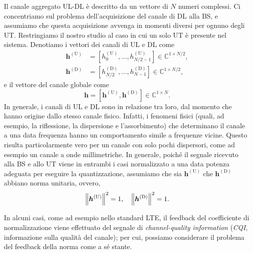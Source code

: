 Il canale aggregato UL-DL è descritto da un vettore di \(N\) numeri complessi.
Ci concentriamo sul problema dell'acquisizione del canale di DL alla BS, e
assumiamo che questa acquisizione avvenga in momenti diversi per ognuno degli
UT. Restringiamo il nostro studio al caso in cui un solo UT è presente nel
sistema. Denotiamo i vettori dei canali di UL e DL come
\begin{equation}
    \begin{aligned}
        \bm{h}^\mathrm{(U)} &= \left[
            h_0^\mathrm{(U)}, \dots, h_{N/2-1}^\mathrm{(U)}
            \right] \in \mathbb{C}^{1 \times N/2},\\
        \bm{h}^\mathrm{(D)} &= \left[
            h_{N/2}^\mathrm{(D)}, \dots, h_{N-1}^\mathrm{(D)}
            \right] \in \mathbb{C}^{1 \times N/2},
    \end{aligned}
\end{equation}
e il vettore del canale globale come
\begin{equation}
    \bm{h} = \left[
        \bm{h}^\mathrm{(U)}, \bm{h}^\mathrm{(D)}
        \right] \in \mathbb{C}^{1 \times N}.
\end{equation}
In generale, i canali di UL e DL sono in relazione tra loro, dal momento che
hanno origine dallo stesso canale fisico. Infatti, i fenomeni fisici (quali, ad
esempio, la riflessione, la dispersione e l'assorbimento) che determinano il
canale a una data frequenza hanno un comportamento simile a frequenze vicine.
Questo risulta particolarmente vero per un canale con solo pochi dispersori,
come ad esempio un canale a onde millimetriche. In generale, poiché il segnale
ricevuto alla BS e allo UT viene in entrambi i casi normalizzato a una data
potenza adeguata per eseguire la quantizzazione, assumiamo che sia
\(\bm{h}^\mathrm{(U)}\) che \(\bm{h}^\mathrm{(D)}\) abbiano norma unitaria,
ovvero,
\begin{equation}
    \left\| \bm{h}^\mathrm{(U)} \right\|^2 = 1, \quad
    \left\| \bm{h}^\mathrm{(D)} \right\|^2 = 1.
\end{equation}

In alcuni casi, come ad esempio nello standard LTE, il feedback del
coefficiente di normalizzazione viene effettuato del segnale di
\textit{channel-quality information} (\textit{CQI}, informazione sulla qualità
del canale); per cui, possiamo considerare il problema del feedback della norma
come a sé stante.\footnotemark


